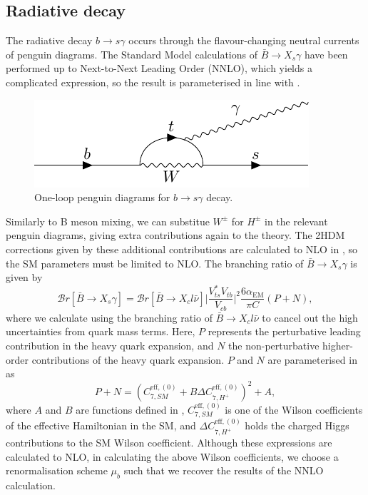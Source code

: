 \documentclass[a4paper,12pt]{article}
\begin{document}
\subsection{Radiative decay}
\label{subsec:rad}
The radiative decay $b\to s\gamma$ occurs through the flavour-changing neutral currents of penguin diagrams.
The Standard Model calculations of $\bar{B}\to X_s\gamma$ have been performed up to Next-to-Next Leading Order (NNLO), which yields a complicated expression, so the result is parameterised in line with \cite{desc,susy}.
\begin{figure}[H]
    \centering
    \includegraphics[width=\textwidth]{bsgam.pdf}
    \caption{\label{fig:bsgam} One-loop penguin diagrams for $b\to s\gamma$ decay.}
\end{figure}
Similarly to B meson mixing, we can substitue $W^\pm$ for $H^\pm$ in the relevant penguin diagrams, giving extra contributions again to the theory. 
The 2HDM corrections given by these additional contributions are calculated to NLO in \cite{susy}, so the SM parameters must be limited to NLO.
The branching ratio of $\bar{B}\to X_s\gamma$ is given by
\begin{equation}
    \label{eq:xsgam}
    \mathcal{B}r[\bar{B}\to X_s\gamma] = \mathcal{B}r[\bar{B}\to X_cl\bar{\nu}] \bigg|\frac{V_{ts}^*V_{tb}}{V_{cb}}\bigg|^2 \frac{6\alpha_{\text{EM}}}{\pi C}(P+N),
\end{equation}
where we calculate using the branching ratio of $\bar{B}\to X_cl\bar{\nu}$ to cancel out the high uncertainties from quark mass terms.
Here, $P$ represents the perturbative leading contribution in the heavy quark expansion, and $N$ the non-perturbative higher-order contributions of the heavy quark expansion.
$P$ and $N$ are parameterised in \cite{desc,susy} as 
\begin{equation}
    \label{eq:pplsn}
    P+N = (C^{\text{eff},(0)}_{7,SM}+B\Delta C_{7,H^+}^{\text{eff},(0)})^2+A,
\end{equation}
where $A$ and $B$ are functions defined in \cite{desc}, $C_{7,SM}^{\text{eff},(0)}$ is one of the Wilson coefficients of the effective Hamiltonian in the SM, and $\Delta C_{7,H^+}^{\text{eff},(0)}$ holds the charged Higgs contributions to the SM Wilson coefficient. 
Although these expressions are calculated to NLO, in calculating the above Wilson coefficients, we choose a renormalisation scheme $\mu_b$ such that we recover the results of the NNLO calculation. 
\end{document}
